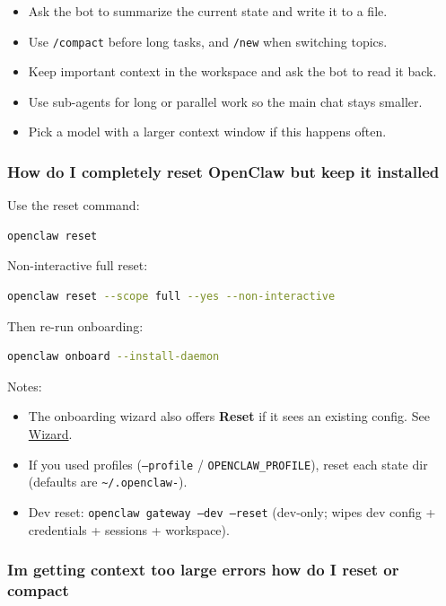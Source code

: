 \begin{itemize}
  \item Ask the bot to summarize the current state and write it to a file.
  \item Use \texttt{/compact} before long tasks, and \texttt{/new} when switching topics.
  \item Keep important context in the workspace and ask the bot to read it back.
  \item Use sub-agents for long or parallel work so the main chat stays smaller.
  \item Pick a model with a larger context window if this happens often.
\end{itemize}


\subsubsection{How do I completely reset OpenClaw but keep it installed}


Use the reset command:

\begin{lstlisting}[language=bash]
openclaw reset
\end{lstlisting}


Non-interactive full reset:

\begin{lstlisting}[language=bash]
openclaw reset --scope full --yes --non-interactive
\end{lstlisting}


Then re-run onboarding:

\begin{lstlisting}[language=bash]
openclaw onboard --install-daemon
\end{lstlisting}


Notes:

\begin{itemize}
  \item The onboarding wizard also offers \textbf{Reset} if it sees an existing config. See \href{/start/wizard}{Wizard}.
  \item If you used profiles (\texttt{--profile} / \texttt{OPENCLAW\_PROFILE}), reset each state dir (defaults are \texttt{\textasciitilde{}/.openclaw-}).
  \item Dev reset: \texttt{openclaw gateway --dev --reset} (dev-only; wipes dev config + credentials + sessions + workspace).
\end{itemize}


\subsubsection{Im getting context too large errors how do I reset or compact}


